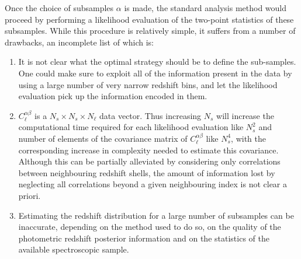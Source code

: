 \documentclass[twocolumn,amsfont,amssymb,amsmath, showpacs,balancelastpage, nofootinbib]{revtex4-1}
\begin{document}
      Once the choice of subsamples $\alpha$ is made, the standard analysis method would proceed by performing a likelihood evaluation of the two-point statistics of these subsamples. While this procedure is relatively simple, it suffers from a number of drawbacks, an incomplete list of which is:
      \begin{enumerate}
        \item It is not clear what the optimal strategy should be to define the sub-samples. One could make sure to exploit all of the information present in the data by using a large number of very narrow redshift bins, and let the likelihood evaluation pick up the information encoded in them.
        \item $C^{\alpha\beta}_\ell$ is a $N_s\times N_s\times N_\ell$ data vector. Thus increasing $N_s$ will increase the computational time required for each likelihood evaluation like $N_s^2$ and number of elements of the covariance matrix of $C^{\alpha\beta}_\ell$ like $N_s^4$, with the corresponding increase in complexity needed to estimate this covariance. Although this can be partially alleviated by considering only correlations between neighbouring redshift shells, the amount of information lost by neglecting all correlations beyond a given neighbouring index is not clear a priori.
        \item Estimating the redshift distribution for a large number of subsamples can be inaccurate, depending on the method used to do so, on the quality of the photometric redshift posterior information and on the statistics of the available spectroscopic sample.
     \end{enumerate}
  
\end{document}
